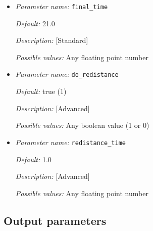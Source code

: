 \begin{itemize}
{\it Possible values:} Any floating point number


\item {\it Parameter name:} {\tt final\_time}
\label{parameters:final_time}


{\it Default:} 21.0

{\it Description:} [Standard] 

{\it Possible values:} Any floating point number


\item {\it Parameter name:} {\tt do\_redistance}
\label{parameters:do_redistance}


{\it Default:} true (1)

{\it Description:} [Advanced] 

{\it Possible values:} Any boolean value (1 or 0)


\item {\it Parameter name:} {\tt redistance\_time}
\label{parameters:redistance_time}


{\it Default:} 1.0

{\it Description:} [Advanced] 

{\it Possible values:} Any floating point number

\end{itemize}


\subsection{Output parameters}
\label{parameters:output}

